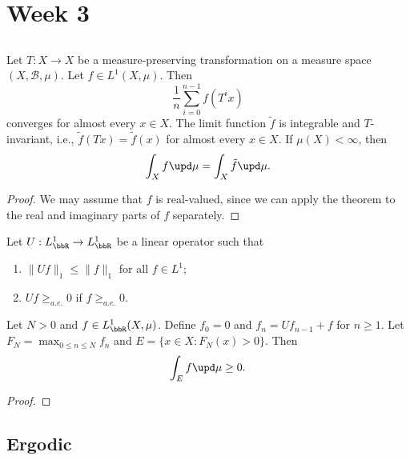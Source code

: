 \section{Week 3}


\subsection{}

    \begin{theorem}\label{thm:Birkhoff_Ergodic_Theorem}
        Let \(T:X\to X\) be a measure-preserving transformation on a measure space \((X, \mathcal{B}, \mu)\). 
        Let \(f\in L^1(X, \mu)\). 
        Then 
        \[ \frac{1}{n} \sum_{i=0}^{n-1} f(T^i x) \]
        converges for almost every \(x\in X\).
        The limit function \(\tilde{f}\) is integrable and \(T\)-invariant, i.e., \(\tilde{f}(Tx) = \tilde{f}(x)\) for almost every \(x\in X\).
        If \(\mu(X) < \infty\), then
        \[ \int_X f \upd\mu = \int_X \tilde{f} \upd\mu. \]
    \end{theorem}
    \begin{proof}
        We may assume that \(f\) is real-valued, since we can apply the theorem to the real and imaginary parts of \(f\) separately.

    \end{proof}

    \begin{theorem}\label{thm:Maximal_Ergodic_Theorem}
        Let \(U: L_\bbR^1 \to L_\bbR^1\) be a linear operator such that
        \begin{enumerate}
            \item \(\|Uf\|_1 \leq \|f\|_1\) for all \(f\in L^1\);
            \item \(Uf \geq_{a.e.} 0\) if \(f\geq_{a.e.} 0\).
        \end{enumerate}
        Let \(N>0\) and \(f \in L^1_\bbR(X, \mu)\). 
        Define \(f_0 = 0\) and \(f_n = Uf_{n-1} + f\) for \(n\geq 1\).
        Let \(F_N = \max_{0\leq n \leq N} f_n\) and \(E = \{x\in X: F_N(x) > 0\}\).
        Then 
        \[
            \int_E f \upd\mu \geq 0.
        \]
    \end{theorem}
    \begin{proof}
    \end{proof}


\subsection{Ergodic}

